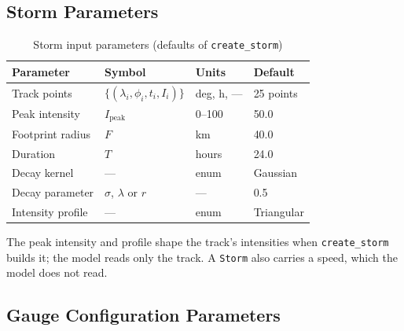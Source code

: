 \documentclass[11pt,a4paper]{article}
\begin{document}
\mkminputs

\subsection{Storm Parameters}

\begin{table}[H]
    \centering
    \caption{Storm input parameters (defaults of \texttt{create\_storm})}
    \label{tab:storm_params}
    \begin{tabular}{llll}
        \toprule
        \textbf{Parameter} & \textbf{Symbol} & \textbf{Units} & \textbf{Default} \\
        \midrule
        Track points & $\{(\lambda_i, \phi_i, t_i, I_i)\}$ & deg, h, --- & 25 points \\
        Peak intensity & $I_{\text{peak}}$ & 0--100 & 50.0 \\
        Footprint radius & $F$ & km & 40.0 \\
        Duration & $T$ & hours & 24.0 \\
        Decay kernel & --- & enum & Gaussian \\
        Decay parameter & $\sigma$, $\lambda$ or $r$ & --- & 0.5 \\
        Intensity profile & --- & enum & Triangular \\
        \bottomrule
    \end{tabular}
\end{table}

\noindent The peak intensity and profile shape the track's intensities when
\texttt{create\_storm} builds it; the model reads only the track. A \texttt{Storm} also
carries a speed, which the model does not read.

\subsection{Gauge Configuration Parameters}
\end{document}
